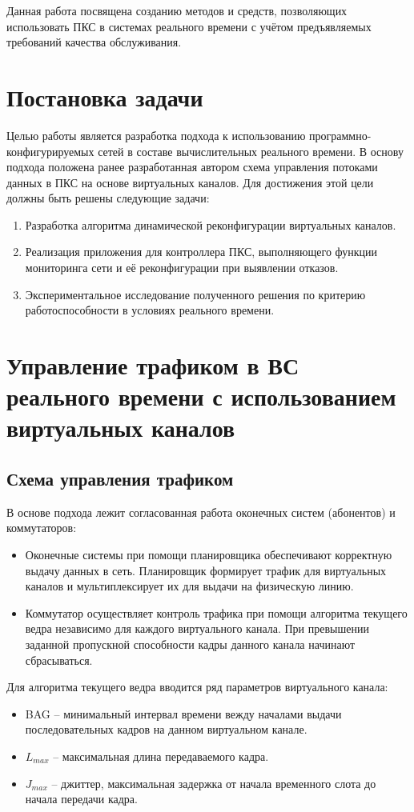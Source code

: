 \documentclass[12pt, a4paper]{article}
\begin{document}
Данная работа посвящена созданию методов и средств, позволяющих использовать ПКС в системах реального времени с учётом предъявляемых требований качества обслуживания.

\section{Постановка задачи}
Целью работы является разработка подхода к использованию программно-конфигурируемых сетей в составе вычислительных реального времени. В основу подхода положена ранее разработанная автором схема управления потоками данных в ПКС на основе виртуальных каналов. Для достижения этой цели должны быть решены следующие задачи:
\begin{enumerate}
	\item Разработка алгоритма динамической реконфигурации виртуальных каналов.
	\item Реализация приложения для контроллера ПКС, выполняющего функции мониторинга сети и её реконфигурации при выявлении отказов.
	\item Экспериментальное исследование полученного решения по критерию работоспособности в условиях реального времени.
\end{enumerate}

\section{Управление трафиком в ВС реального времени с использованием виртуальных каналов} \label{sec:scheme}
\subsection{Схема управления трафиком}
В основе подхода лежит согласованная работа оконечных систем (абонентов) и коммутаторов:
\begin{itemize}
	\item Оконечные системы при помощи планировщика обеспечивают корректную выдачу данных в сеть. Планировщик формирует трафик для виртуальных каналов и мультиплексирует их для выдачи на физическую линию.
	\item Коммутатор осуществляет контроль трафика при помощи алгоритма текущего ведра независимо для каждого виртуального канала. При превышении заданной пропускной способности кадры данного канала начинают сбрасываться.
\end{itemize}


Для алгоритма текущего ведра вводится ряд параметров виртуального канала:
\begin{itemize}
	\item BAG -- минимальный интервал времени вежду началами выдачи последовательных кадров на данном виртуальном канале.
	\item $L_{max}$ -- максимальная длина передаваемого кадра.
	\item $J_{max}$ -- джиттер, максимальная задержка от начала временного слота до начала передачи кадра.
\end{itemize}
\end{document}
